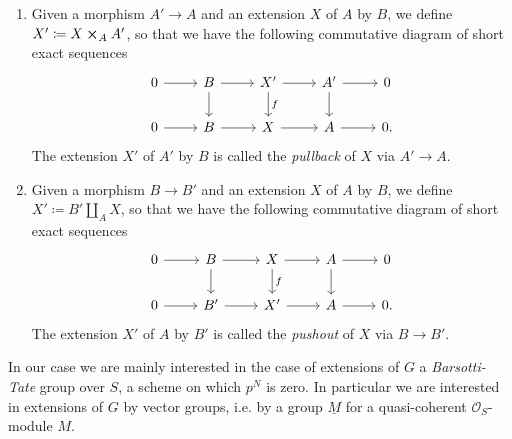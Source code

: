 \documentclass[../Main]{subfiles}
\begin{document}
\begin{defn}\leavevmode\vspace{-\baselineskip}
\begin{enumerate}
	\item Given a morphism $A' \to A$ and an extension $X$
		of $A$ by $B$, we define $X' \coloneqq X \cross_A A'$,
		so that we have the following commutative diagram
		of short exact sequences
		\begin{equation*}
		\begin{tikzcd}
			0 \arrow[r, "", rightarrow] &
			B \arrow[r, "", rightarrow] 
			\arrow[d, "", rightarrow] &
			X' \arrow[r, "", rightarrow] 
			\arrow[d, "f", rightarrow] &
			A' \arrow[r, "", rightarrow] 
			\arrow[d, "", rightarrow] &
			0\\
			0 \arrow[r, "", rightarrow] &
			B \arrow[r, "", rightarrow] &
			X \arrow[r, "", rightarrow] &
			A \arrow[r, "", rightarrow] &
			0
		.\end{tikzcd}
		\end{equation*}
		The extension $X'$ of $A'$ by $B$
		is called the {\em pullback} of $X$ via $A' \to A$.

	\item Given a morphism $B \to B'$ and an extension $X$
		of $A$ by $B$, we define $X' \coloneqq B' \coprod_A X$,
		so that we have the following commutative diagram
		of short exact sequences
		\begin{equation*}
		\begin{tikzcd}
			0 \arrow[r, "", rightarrow] &
			B \arrow[r, "", rightarrow] 
			\arrow[d, "", rightarrow] &
			X \arrow[r, "", rightarrow] 
			\arrow[d, "f", rightarrow] &
			A \arrow[r, "", rightarrow] 
			\arrow[d, "", rightarrow] &
			0\\
			0 \arrow[r, "", rightarrow] &
			B' \arrow[r, "", rightarrow] &
			X' \arrow[r, "", rightarrow] &
			A \arrow[r, "", rightarrow] &
			0
		.\end{tikzcd}
		\end{equation*}
		The extension $X'$ of $A$ by $B'$
		is called the {\em pushout} of $X$ via $B \to B'$.
\end{enumerate}
\end{defn}


\noindent
In our case we are mainly interested in the case of extensions of $G$
a {\em Barsotti-Tate} group over $S$, a scheme on which $p^N$ is zero.
In particular we are interested in extensions of $G$ by vector groups,
i.e. by a group $\underline{M}$ for a quasi-coherent $\mathcal{O}_{ S }$-module $M$.
\end{document}
